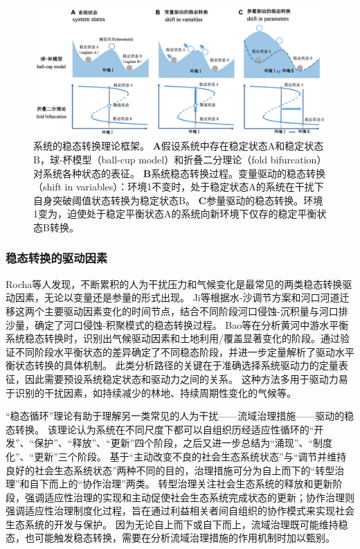\begin{figure}[!ht] %
    \centering
    \includegraphics[width=\textwidth]{img/ch1/ch1_regime_shift.png}
    \caption[系统的稳态转换理论框架]{系统的稳态转换理论框架。
    \textbf{A}假设系统中存在稳定状态A和稳定状态B，球-杯模型（ball-cup model）和折叠二分理论（fold bifurcation）对系统各种状态的表征。
    \textbf{B}系统稳态转换过程。变量驱动的稳态转换（shift in variables）：环境\romannumeral1不变时，处于稳定状态A的系统在干扰下自身突破阈值状态转换为稳定状态B。
    \textbf{C}参量驱动的稳态转换。环境\romannumeral1变为，迫使处于稳定平衡状态A的系统向新环境下仅存的稳定平衡状态B转换。}\label{ch1:fig:regime_shift}
\end{figure}

\subsubsection{稳态转换的驱动因素}

Rocha等人发现，不断累积的人为干扰压力和气候变化是最常见的两类稳态转换驱动因素，无论以变量还是参量的形式出现\cite{rocha2018}。
Ji等根据水-沙调节方案和河口河道迁移这两个主要驱动因素变化的时间节点，结合不同阶段河口侵蚀-沉积量与河口排沙量，确定了河口侵蚀-积聚模式的稳态转换过程\cite{ji2018}。
Bao等在分析黄河中游水平衡系统稳态转换时，识别出气候驱动因素和土地利用/覆盖显著变化的阶段。通过验证不同阶段水平衡状态的差异确定了不同稳态阶段，并进一步定量解析了驱动水平衡状态转换的具体机制\cite{bao2019}。
此类分析路径的关键在于准确选择系统驱动力的定量表征，因此需要预设系统稳定状态和驱动力之间的关系。
这种方法多用于驱动力易于识别的干扰因素，如持续减少的林地、持续周期性变化的气候等。

“稳态循环”理论有助于理解另一类常见的人为干扰——流域治理措施——驱动的稳态转换。
该理论认为系统在不同尺度下都可以自组织历经适应性循环的“开发”、“保护”、“释放”、“更新”四个阶段\cite{gunderson2001}，之后又进一步总结为“涌现”、“制度化”、“更新”三个阶段。
基于“主动改变不良的社会\textendash{}生态系统状态”与“调节并维持良好的社会\textendash{}生态系统状态”两种不同的目的，治理措施可分为自上而下的“转型治理”和自下而上的“协作治理”两类\cite{song2019}。
转型治理关注社会\textendash{}生态系统的释放和更新阶段，强调适应性治理的实现和主动促使社会\textendash{}生态系统完成状态的更新；协作治理则强调适应性治理制度化过程，旨在通过利益相关者间自组织的协作模式来实现社会\textendash{}生态系统的开发与保护\cite{song2019}。
因为无论自上而下或自下而上，流域治理既可能维持稳态，也可能触发稳态转换，需要在分析流域治理措施的作用机制时加以甄别。

